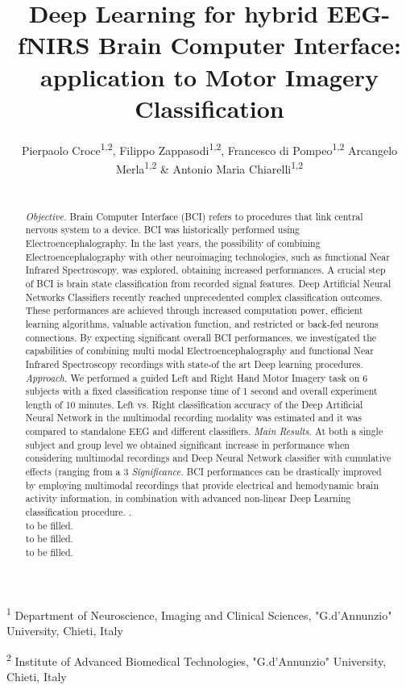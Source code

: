 \documentclass[12pt ]{iopart}
\begin{document}
\title[DNN for EEG-fNIRS BCI]{Deep Learning for  hybrid EEG-fNIRS Brain Computer Interface: application to Motor Imagery Classification}

\author{Pierpaolo Croce\textsuperscript{1,2}, Filippo Zappasodi\textsuperscript{1,2}, Francesco di Pompeo\textsuperscript{1,2} Arcangelo Merla\textsuperscript{1,2} \& Antonio Maria Chiarelli\textsuperscript{1,2}}

\vspace{10pt}
\begin{indented}
\item[] \textsuperscript{1} Department of Neuroscience, Imaging and Clinical Sciences, "G.d’Annunzio" University, Chieti, Italy
\item[] \textsuperscript{2} Institute of Advanced Biomedical Technologies, "G.d’Annunzio" University, Chieti, Italy
\end{indented}

\begin{abstract}
	\\
	\textit{Objective.} Brain Computer Interface (BCI) refers to procedures that link central nervous system to a device.  BCI was historically performed using Electroencephalography. In the last years, the possibility of combining Electroencephalography with other neuroimaging technologies, such as functional Near Infrared Spectroscopy, was explored, obtaining increased performances. A crucial step of BCI is brain state classification from recorded signal features. Deep Artificial Neural Networks Classifiers recently reached unprecedented complex classification outcomes. These performances are achieved through increased computation power, efficient learning algorithms, valuable activation function, and restricted or back-fed neurons connections. By expecting significant overall BCI performances, we investigated the capabilities of combining multi modal Electroencephalography and functional Near Infrared Spectroscopy recordings with state-of the art Deep learning procedures.
	\textit{Approach.} We performed a guided Left and Right Hand Motor Imagery task on 6 subjects with a fixed classification response time of 1 second and overall experiment length of 10 minutes. Left vs. Right classification accuracy of the Deep Artificial Neural Network in the multimodal recording modality was estimated and it was compared to standalone EEG and different classifiers.
	\textit{Main Results.} At both a single subject and group level we obtained significant increase in performance when considering multimodal recordings and Deep Neural Network classifier with cumulative effects (ranging from a 3%
	\textit{Significance.} BCI performances can be drastically improved by employing multimodal recordings that provide electrical and hemodynamic brain activity information, in combination with advanced non-linear Deep Learning classification procedure.
	. \\
	 to be filled.\\
	 to be filled. \\
	 to be filled.
\end{abstract}
\end{document}
